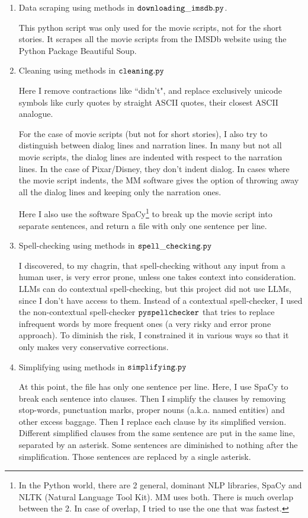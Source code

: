 \documentclass[12pt]{article}
\begin{document}
\begin{enumerate}
\item Data scraping using methods in $\tt downloading\_imsdb.py$.

This python script was only used for the movie
scripts, not for the short stories. It 
scrapes all the movie scripts from the IMSDb
website using the Python Package Beautiful Soup.

\item Cleaning using methods in $\tt cleaning.py$

Here I remove contractions like ``didn't",
and replace exclusively unicode symbols like
curly quotes by straight ASCII quotes, their closest ASCII analogue.

For the case of movie scripts (but not for short 
stories), I also try to distinguish between 
dialog lines and narration lines.
In many but not all movie scripts, the dialog lines are indented with 
respect to the narration lines.
In the case of Pixar/Disney, they don't indent dialog. In cases where the movie script indents,
the MM software gives the option of throwing away all the dialog lines and keeping only the narration
ones.

Here I also use the software SpaCy\footnote{In the Python
world, there are 2 general, dominant
NLP libraries, SpaCy and NLTK (Natural Language Tool Kit). MM uses both. There is much overlap
between the 2. In case of overlap, I tried to use the one that was fastest.} to break up the movie script into 
separate sentences, and return a file with only
one sentence per line.

\item Spell-checking using methods in $\tt spell\_checking.py$

I discovered, to my chagrin, that spell-checking
without any input from a human user,
is very error prone, unless one takes context into consideration. LLMs can do contextual spell-checking, but this project did not use LLMs,
since I don't have access to them.
Instead of a contextual spell-checker,
I used the non-contextual
spell-checker $\tt pyspellchecker$
that tries to replace infrequent words by
more frequent ones (a very risky
and error prone approach). To 
diminish the risk, I
 constrained it in various ways so
that it only makes very conservative corrections.

\item Simplifying using methods in $\tt simplifying.py$

At this point, the file
has only one
sentence per line.
Here, I  use SpaCy to
break each sentence into clauses.
Then I simplify the clauses by removing
stop-words, punctuation marks, proper nouns (a.k.a. named entities) and other excess baggage.
Then I replace each clause by its simplified version.
Different simplified clauses from the same sentence
are put in the same line, separated by an asterisk.
Some sentences are diminished to nothing after
the simplification.
Those sentences are replaced by a single asterisk.


\end{enumerate}
\end{document}
